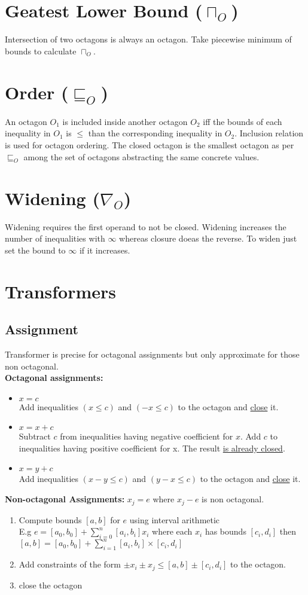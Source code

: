 \section{Geatest Lower Bound ($\sqcap_O$)}
Intersection of two octagons is always an octagon. Take piecewise minimum of bounds to calculate $\sqcap_O$.
\section{Order ($\sqsubseteq_O$)}
An octagon $O_1$ is included inside another octagon $O_2$ iff the bounds of each inequality in $O_1$ is $\leq$ than the corresponding inequality in $O_2$. Inclusion relation is used for octagon ordering. The closed octagon is the smallest octagon as per $\sqsubseteq_O$ among the set of octagons abstracting the same concrete values.
\section{Widening ($\nabla_O$)}
Widening requires the first operand to not be closed. Widening increases the number of inequalities with $\infty$ whereas closure doeas the reverse. To widen just set the bound to $\infty$ if it increases.
\section{Transformers}
\subsection{Assignment}
Transformer is precise for octagonal assignments but only approximate for those non octagonal.\\
\textbf{Octagonal assignments:}
\begin{itemize}
\item $x=c$ \\
Add inequalities $(x \leq c)$ and $(-x \leq c)$ to the octagon and \underline{close} it.
\item $x = x + c$\\
Subtract $c$ from inequalities having negative coefficient for $x$. Add $c$ to inequalities having positive coefficient for x. The result \underline{is already closed}. 
\item $x = y + c$\\
Add inequalities $(x-y\leq c)$ and $(y-x \leq c)$ to the octagon and \underline{close} it.
\end{itemize}
\textbf{Non-octagonal Assignments:}
$x_j = e$ where $x_j - e$ is non octagonal. 
\begin{enumerate}
\item Compute bounds $[a,b]$ for $e$ using interval arithmetic\\
E.g $e = [a_0, b_0] + \sum_{i=0}^n[a_i,b_i]x_i$ where each $x_i$ has bounds $[c_i,d_i]$ then $[a,b]=[a_0,b_0]+\sum_{i=1}^n[a_i,b_i] \times [c_i,d_i]$
\item Add constraints of the form $\pm x_i \pm x_j \leq [a,b] \pm [c_i,d_i]$ to the octagon.
\item close the octagon
\end{enumerate}
